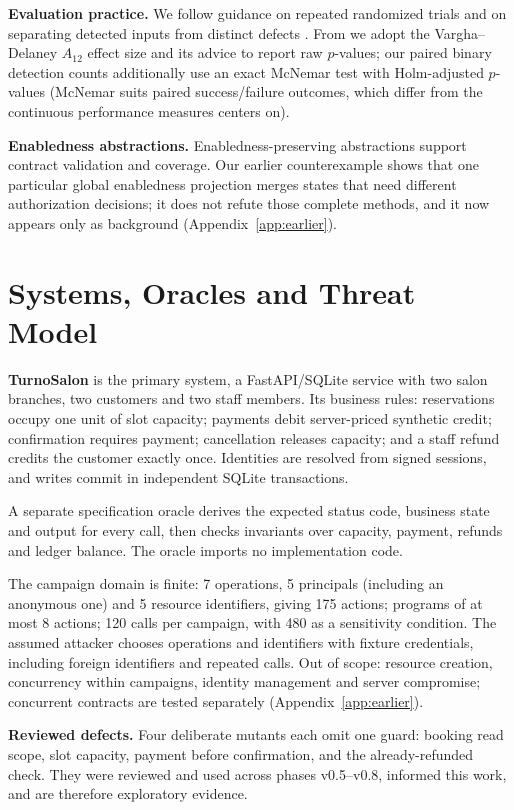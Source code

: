 \documentclass[conference]{IEEEtran}
\begin{document}
\textbf{Evaluation practice.} We follow guidance on repeated randomized trials and on
separating detected inputs from distinct defects \cite{r17}. From \cite{r23} we adopt the
Vargha--Delaney $A_{12}$ effect size and its advice to report raw $p$-values; our paired
binary detection counts additionally use an exact McNemar test with Holm-adjusted
$p$-values (McNemar suits paired success/failure outcomes, which differ from the
continuous performance measures \cite{r23} centers on).

\textbf{Enabledness abstractions.} Enabledness-preserving abstractions \cite{r3,r4,r14}
support contract validation and coverage. Our earlier counterexample \cite{r1,r2} shows
that one particular global enabledness projection merges states that need different
authorization decisions; it does not refute those complete methods, and it now appears
only as background (Appendix~\ref{app:earlier}).

\section{Systems, Oracles and Threat Model}
\textbf{TurnoSalon} is the primary system, a FastAPI/SQLite service with two salon
branches, two customers and two staff members. Its business rules: reservations occupy
one unit of slot capacity; payments debit server-priced synthetic credit; confirmation
requires payment; cancellation releases capacity; and a staff refund credits the customer
exactly once. Identities are resolved from signed sessions, and writes commit in
independent SQLite transactions.

A separate specification oracle derives the expected status code, business state and
output for every call, then checks invariants over capacity, payment, refunds and ledger
balance. The oracle imports no implementation code.

The campaign domain is finite: 7 operations, 5 principals (including an anonymous one)
and 5 resource identifiers, giving 175 actions; programs of at most 8 actions; 120 calls
per campaign, with 480 as a sensitivity condition. The assumed attacker chooses
operations and identifiers with fixture credentials, including foreign identifiers and
repeated calls. Out of scope: resource creation, concurrency within campaigns, identity
management and server compromise; concurrent contracts are tested separately
(Appendix~\ref{app:earlier}).

\textbf{Reviewed defects.} Four deliberate mutants each omit one guard: booking read
scope, slot capacity, payment before confirmation, and the already-refunded check. They
were reviewed and used across phases v0.5--v0.8, informed this work, and are therefore
exploratory evidence.
\end{document}
